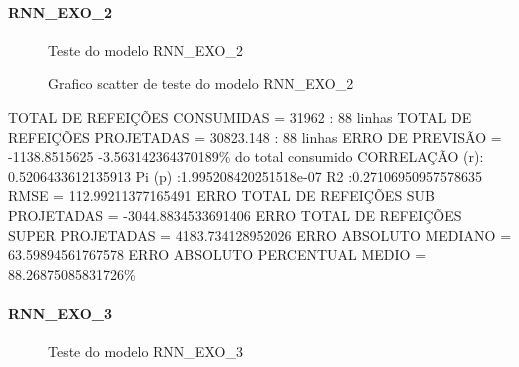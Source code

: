 \documentclass[	12pt, Times, openright, twoside, a4paper, english, brazil]{abntex2}
\begin{document}
              \paragraph{RNN\_EXO\_2}
                \begin{figure}[!ht]
                  \caption{Teste do modelo RNN\_EXO\_2 \label{fig:case2_rnn_exo_2_test} }
                \end{figure}

                \begin{figure}[!ht]
                  \caption{Grafico scatter de teste do modelo RNN\_EXO\_2 \label{fig:case2_rnn_exo_2_test_scatter} }
                \end{figure}
                \hline TOTAL DE REFEIÇÕES CONSUMIDAS = 31962 : 88 linhas
                \hline TOTAL DE REFEIÇÕES PROJETADAS = 30823.148 : 88 linhas
                \hline ERRO DE PREVISÃO = -1138.8515625 -3.563142364370189\% do total consumido
                \hline CORRELAÇÃO (r): 0.5206433612135913 Pi (p) :1.995208420251518e-07 R2 :0.27106950957578635
                \hline RMSE = 112.99211377165491
                \hline ERRO TOTAL DE REFEIÇÕES SUB PROJETADAS = -3044.8834533691406
                \hline ERRO TOTAL DE REFEIÇÕES SUPER PROJETADAS = 4183.734128952026
                \hline ERRO ABSOLUTO MEDIANO = 63.59894561767578
                \hline ERRO ABSOLUTO PERCENTUAL MEDIO = 88.26875085831726\%
              \paragraph{RNN\_EXO\_3}
                \begin{figure}[!ht]
                  \caption{Teste do modelo RNN\_EXO\_3 \label{fig:case3_rnn_exo_3_test} }
                \end{figure}
\end{document}
